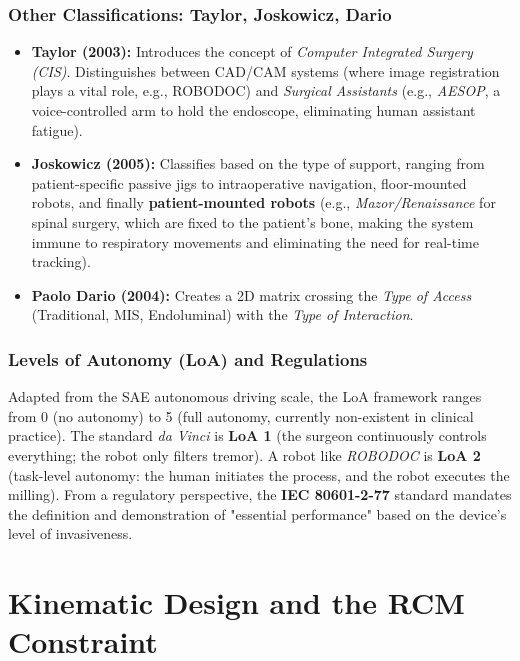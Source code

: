 \documentclass[11pt,a4paper,twoside]{report}
\begin{document}
\subsection{Other Classifications: Taylor, Joskowicz, Dario}
\begin{itemize}
    \item \textbf{Taylor (2003):} Introduces the concept of \textit{Computer Integrated Surgery (CIS)}. Distinguishes between CAD/CAM systems (where image registration plays a vital role, e.g., ROBODOC) and \textit{Surgical Assistants} (e.g., \textit{AESOP}, a voice-controlled arm to hold the endoscope, eliminating human assistant fatigue).
    \item \textbf{Joskowicz (2005):} Classifies based on the type of support, ranging from patient-specific passive jigs to intraoperative navigation, floor-mounted robots, and finally \textbf{patient-mounted robots} (e.g., \textit{Mazor/Renaissance} for spinal surgery, which are fixed to the patient's bone, making the system immune to respiratory movements and eliminating the need for real-time tracking).
    \item \textbf{Paolo Dario (2004):} Creates a 2D matrix crossing the \textit{Type of Access} (Traditional, MIS, Endoluminal) with the \textit{Type of Interaction}.
\end{itemize}

\subsection{Levels of Autonomy (LoA) and Regulations}
Adapted from the SAE autonomous driving scale, the LoA framework ranges from 0 (no autonomy) to 5 (full autonomy, currently non-existent in clinical practice). The standard \textit{da Vinci} is \textbf{LoA 1} (the surgeon continuously controls everything; the robot only filters tremor). A robot like \textit{ROBODOC} is \textbf{LoA 2} (task-level autonomy: the human initiates the process, and the robot executes the milling).
From a regulatory perspective, the \textbf{IEC 80601-2-77} standard mandates the definition and demonstration of "essential performance" based on the device's level of invasiveness.

\chapter{Kinematic Design and the RCM Constraint}
\end{document}
